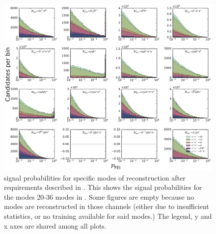 \begin{figure}[htbp!]

    \includegraphics[width=1\textwidth]{figures/appendices/FEI_signal_probabilities/Bp_feiSigProbs2.pdf}

    \caption{\label{fig:feisigprobs2} \FEI signal probabilities for specific modes of \Bp reconstruction after requirements described in .
    This shows the signal probabilities for the modes 20-36 \Bp modes in .
    Some figures are empty because no modes are reconstructed in those channels (either due to insufficient statistics, or no training available for said modes.)
    The legend, y and x axes are shared among all plots.
    }
\end{figure}

